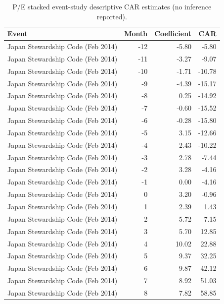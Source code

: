 \begin{table}
\caption{P/E stacked event-study descriptive CAR estimates (no inference reported).}
\label{tab:robustness_pe_event_study_coefs}
\begin{tabular}{lrrr}
\toprule
Event & Month & Coefficient & CAR \\
\midrule
Japan Stewardship Code (Feb 2014) & -12 & -5.80 & -5.80 \\
Japan Stewardship Code (Feb 2014) & -11 & -3.27 & -9.07 \\
Japan Stewardship Code (Feb 2014) & -10 & -1.71 & -10.78 \\
Japan Stewardship Code (Feb 2014) & -9 & -4.39 & -15.17 \\
Japan Stewardship Code (Feb 2014) & -8 & 0.25 & -14.92 \\
Japan Stewardship Code (Feb 2014) & -7 & -0.60 & -15.52 \\
Japan Stewardship Code (Feb 2014) & -6 & -0.28 & -15.80 \\
Japan Stewardship Code (Feb 2014) & -5 & 3.15 & -12.66 \\
Japan Stewardship Code (Feb 2014) & -4 & 2.43 & -10.22 \\
Japan Stewardship Code (Feb 2014) & -3 & 2.78 & -7.44 \\
Japan Stewardship Code (Feb 2014) & -2 & 3.28 & -4.16 \\
Japan Stewardship Code (Feb 2014) & -1 & 0.00 & -4.16 \\
Japan Stewardship Code (Feb 2014) & 0 & 3.20 & -0.96 \\
Japan Stewardship Code (Feb 2014) & 1 & 2.39 & 1.43 \\
Japan Stewardship Code (Feb 2014) & 2 & 5.72 & 7.15 \\
Japan Stewardship Code (Feb 2014) & 3 & 5.70 & 12.85 \\
Japan Stewardship Code (Feb 2014) & 4 & 10.02 & 22.88 \\
Japan Stewardship Code (Feb 2014) & 5 & 9.37 & 32.25 \\
Japan Stewardship Code (Feb 2014) & 6 & 9.87 & 42.12 \\
Japan Stewardship Code (Feb 2014) & 7 & 8.92 & 51.03 \\
Japan Stewardship Code (Feb 2014) & 8 & 7.82 & 58.85 \\

\end{tabular}
\end{table}
